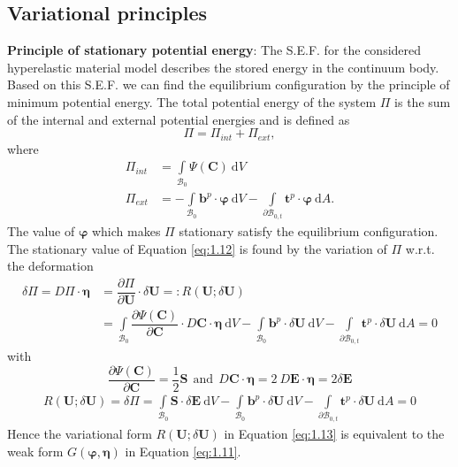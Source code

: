 \documentclass[11pt,a4paper,final]{article}
\begin{document}
\subsection{Variational principles}
\textbf{Principle of stationary potential energy}: The S.E.F. for the considered hyperelastic material model describes the stored energy in the continuum body. Based on this S.E.F. we can find the equilibrium configuration by the principle of minimum potential energy. The total potential energy of the system $\Pi$ is the sum of the internal and external potential energies and is defined as 
\begin{equation}
\Pi = \Pi_{int} + \Pi_{ext},
\label{eq:1.12}
\end{equation}
where 
\begin{align}
\Pi_{int} &= \int\limits_{\mathcal{B}_0} \Psi (\mathbf{C}) \ \mathrm{d}V \\
\Pi_{ext} &= - \int\limits_{\mathcal{B}_0} \mathbf{b}^p \cdot \bm{\varphi} \ \mathrm{d}V - \int\limits_{\mathcal{\partial B}_{0,t}} \mathbf{t}^p \cdot \bm{\varphi} \ \mathrm{d}A.
\end{align}
The value of $\bm{\varphi}$ which makes $\Pi$ stationary satisfy the equilibrium configuration. The stationary value of Equation \eqref{eq:1.12} is found by the variation of $\Pi$ w.r.t. the deformation
\begin{align}
\delta \Pi = D \Pi \cdot \bm{\eta} &= \dfrac{\partial \Pi}{\partial \mathbf{U}} \cdot \delta \mathbf{U} =: R(\mathbf{U}; \delta \mathbf{U})\nonumber \\
&= \int\limits_{\mathcal{B}_0} \dfrac{\partial \Psi (\mathbf{C})}{\partial \mathbf{C}} \cdot D \mathbf{C} \cdot \bm{\eta} \ \mathrm{d}V - \int\limits_{\mathcal{B}_0} \mathbf{b}^p \cdot \delta \mathbf{U} \ \mathrm{d}V - \int\limits_{\mathcal{\partial B}_{0,t}} \mathbf{t}^p \cdot \delta \mathbf{U} \ \mathrm{d}A = 0
\end{align}
with 
\begin{equation}
\dfrac{\partial \Psi (\mathbf{C})}{\partial \mathbf{C}} = \dfrac{1}{2} \mathbf{S} \ \ \text{and} \ \ D \mathbf{C} \cdot \bm{\eta} = 2 \ D \mathbf{E} \cdot \bm{\eta} = 2 \delta \mathbf{E}
\label{eq:1.12.2}
\end{equation}
\begin{align}
R(\mathbf{U}; \delta \mathbf{U}) =\delta \Pi = \int\limits_{\mathcal{B}_0} \mathbf{S} \cdot \delta \mathbf{E} \ \mathrm{d}V - \int\limits_{\mathcal{B}_0} \mathbf{b}^p \cdot \delta \mathbf{U} \ \mathrm{d}V - \int\limits_{\mathcal{\partial B}_{0,t}} \mathbf{t}^p \cdot \delta \mathbf{U} \ \mathrm{d}A = 0 
\label{eq:1.13}
\end{align}
Hence the variational form $R(\mathbf{U}; \delta \mathbf{U})$ in Equation \eqref{eq:1.13} is equivalent to the weak form $G(\bm{\varphi},\bm{\eta})$ in Equation \eqref{eq:1.11}. 
\end{document}
